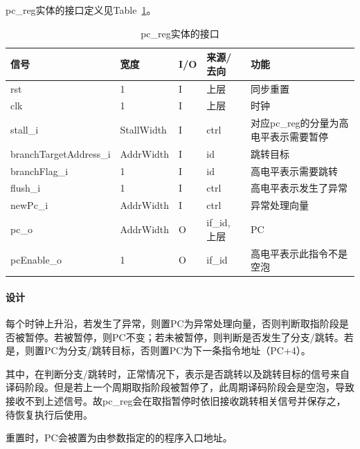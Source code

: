 \documentclass{article}
\begin{document}
\begin{spacing}{1.4}
pc\_reg实体的接口定义见Table~\ref{tb:pcreg-interface}。
\begin{table}[!htb]
\begin{center}
\begin{tabular*}{15cm}{l|l|l|l|p{5cm}}  
\hline  
\textbf{信号}&\textbf{宽度}&\textbf{I/O}&\textbf{来源/去向}&\textbf{功能} \\
\hline rst                     & 1             & I     & 上层          & 同步重置 \\
\hline clk                     & 1             & I     & 上层          & 时钟 \\
\hline stall\_i                & StallWidth    & I     & ctrl          & 对应pc\_reg的分量为高电平表示需要暂停 \\
\hline branchTargetAddress\_i  & AddrWidth     & I     & id            & 跳转目标 \\
\hline branchFlag\_i           & 1             & I     & id            & 高电平表示需要跳转 \\
\hline flush\_i                & 1             & I     & ctrl          & 高电平表示发生了异常 \\
\hline newPc\_i                & AddrWidth     & I     & ctrl          & 异常处理向量 \\
\hline pc\_o                   & AddrWidth     & O     & if\_id, 上层  & PC \\
\hline pcEnable\_o             & 1             & O     & if\_id        & 高电平表示此指令不是空泡 \\
\hline 
\end{tabular*}  
\caption{pc\_reg实体的接口}
\label{tb:pcreg-interface}
\end{center}
\end{table}

\paragraph{设计}\mbox{}

每个时钟上升沿，若发生了异常，则置PC为异常处理向量，否则判断取指阶段是否被暂停。若被暂停，则PC不变；若未被暂停，则判断是否发生了分支/跳转。若是，则置PC为分支/跳转目标，否则置PC为下一条指令地址（PC+4）。

其中，在判断分支/跳转时，正常情况下，表示是否跳转以及跳转目标的信号来自译码阶段。但是若上一个周期取指阶段被暂停了，此周期译码阶段会是空泡，导致接收不到上述信号。故pc\_reg会在取指暂停时依旧接收跳转相关信号并保存之，待恢复执行后使用。

重置时，PC会被置为由参数指定的的程序入口地址。


\end{spacing}
\end{document}
